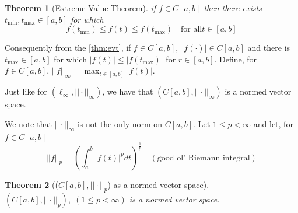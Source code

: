 \documentclass[11pt, oneside]{book}
\theoremstyle{break}
\newtheorem{thm}{Theorem}[section]
\begin{document}
\begin{thm}[Extreme Value Theorem]\label{thm:evt}
	if $f \in C[a,b]$ then there exists $t_{\min}, t_{\max} \in [a, b]$ for which
	\begin{equation}
		f(t_{\min}) \leq f(t) \leq f(t_{\max}) \quad \text{for all} t \in [a, b]
	\end{equation}
\end{thm}

Consequently from the \autoref{thm:evt}, if $f \in C[a, b], \; |f(\cdot)| \in C[a, b]$ and there is $t_{\max} \in [a, b]$ for which $|f(t)| \leq |f(t_{\max})|$ for $r \in [a, b]$. Define, for $f \in C[a,b]$, $||f||_\infty = \max_{t \in [a,b]} |f(t)|$.

Just like for $(\ell_\infty, ||\cdot||_\infty)$, we have that $(C[a,b], ||\cdot||_\infty)$ is a normed vector space.

We note that $||\cdot||_\infty$ is not the only norm on $C[a,b]$. Let $1 \leq p < \infty$ and let, for $f \in C[a, b]$
\begin{equation}
	||f||_p = \left( \int_{a}^{b} |f(t)|^p dt \right)^{\frac{1}{p}} \quad (\text{good ol' Riemann integral})
\end{equation}

\begin{thm}[(\texorpdfstring{$C[a, b], ||\cdot||_p$}{}) as a normed vector space]
	$(C[a,b], ||\cdot||_p), \; (1 \leq p < \infty)$ is a normed vector space.
\end{thm}
\end{document}
